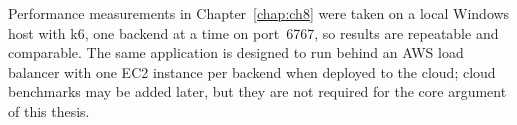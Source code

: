 \par Performance measurements in Chapter~\ref{chap:ch8} were taken on a local Windows host with k6, one backend at a time on port~6767, so results are repeatable and comparable. The same application is designed to run behind an AWS load balancer with one EC2 instance per backend when deployed to the cloud; cloud benchmarks may be added later, but they are not required for the core argument of this thesis.
